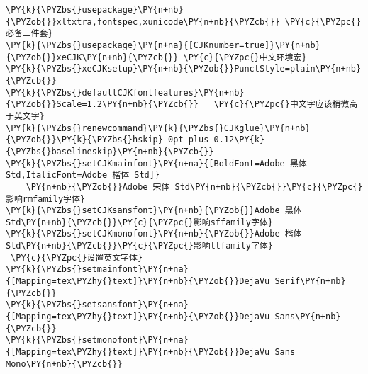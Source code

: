 \begin{Verbatim}[commandchars=\\\{\}]
\PY{k}{\PYZbs{}usepackage}\PY{n+nb}{\PYZob{}}xltxtra,fontspec,xunicode\PY{n+nb}{\PYZcb{}} \PY{c}{\PYZpc{}必备三件套}
\PY{k}{\PYZbs{}usepackage}\PY{n+na}{[CJKnumber=true]}\PY{n+nb}{\PYZob{}}xeCJK\PY{n+nb}{\PYZcb{}} \PY{c}{\PYZpc{}中文环境宏}
\PY{k}{\PYZbs{}xeCJKsetup}\PY{n+nb}{\PYZob{}}PunctStyle=plain\PY{n+nb}{\PYZcb{}}
\PY{k}{\PYZbs{}defaultCJKfontfeatures}\PY{n+nb}{\PYZob{}}Scale=1.2\PY{n+nb}{\PYZcb{}}   \PY{c}{\PYZpc{}中文字应该稍微高于英文字}
\PY{k}{\PYZbs{}renewcommand}\PY{k}{\PYZbs{}CJKglue}\PY{n+nb}{\PYZob{}}\PY{k}{\PYZbs{}hskip} 0pt plus 0.12\PY{k}{\PYZbs{}baselineskip}\PY{n+nb}{\PYZcb{}}
\PY{k}{\PYZbs{}setCJKmainfont}\PY{n+na}{[BoldFont=Adobe 黑体 Std,ItalicFont=Adobe 楷体 Std]}
    \PY{n+nb}{\PYZob{}}Adobe 宋体 Std\PY{n+nb}{\PYZcb{}}\PY{c}{\PYZpc{}影响rmfamily字体}
\PY{k}{\PYZbs{}setCJKsansfont}\PY{n+nb}{\PYZob{}}Adobe 黑体 Std\PY{n+nb}{\PYZcb{}}\PY{c}{\PYZpc{}影响sffamily字体}
\PY{k}{\PYZbs{}setCJKmonofont}\PY{n+nb}{\PYZob{}}Adobe 楷体 Std\PY{n+nb}{\PYZcb{}}\PY{c}{\PYZpc{}影响ttfamily字体}
 \PY{c}{\PYZpc{}设置英文字体}
\PY{k}{\PYZbs{}setmainfont}\PY{n+na}{[Mapping=tex\PYZhy{}text]}\PY{n+nb}{\PYZob{}}DejaVu Serif\PY{n+nb}{\PYZcb{}}
\PY{k}{\PYZbs{}setsansfont}\PY{n+na}{[Mapping=tex\PYZhy{}text]}\PY{n+nb}{\PYZob{}}DejaVu Sans\PY{n+nb}{\PYZcb{}}
\PY{k}{\PYZbs{}setmonofont}\PY{n+na}{[Mapping=tex\PYZhy{}text]}\PY{n+nb}{\PYZob{}}DejaVu Sans Mono\PY{n+nb}{\PYZcb{}}
\end{Verbatim}
